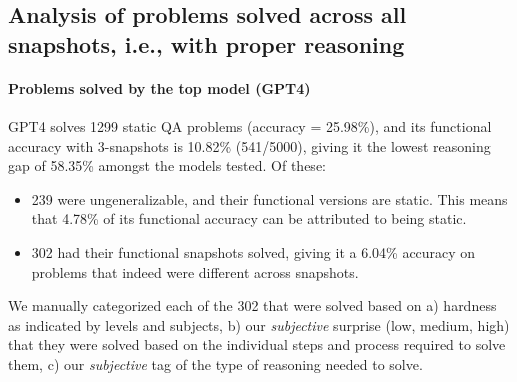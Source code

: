\documentclass[11pt,a4paper]{article}
\begin{document}
\subsection{Analysis of problems solved across all snapshots, i.e., with proper reasoning}
\paragraph{Problems solved by the top model (GPT4)}
GPT4 solves 1299 static QA problems (accuracy = 25.98\%), and its functional accuracy with 3-snapshots is 10.82\% (541/5000), giving it the lowest reasoning gap of 58.35\% amongst the models tested. Of these:
\begin{itemize}
  \item 239 were ungeneralizable, and their functional versions are static. This means that 4.78\% of its functional accuracy can be attributed to being static.
  \item 302 had their functional snapshots solved, giving it a 6.04\% accuracy on problems that indeed were different across snapshots.
\end{itemize}
We manually categorized each of the 302 that were solved based on a) hardness as indicated by levels and subjects, b) our {\em subjective} surprise (low, medium, high) that they were solved based on the individual steps and process required to solve them, c) our {\em subjective} tag of the type of reasoning needed to solve.
\end{document}
